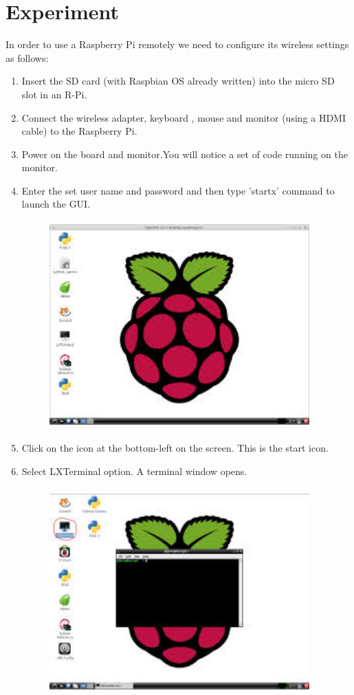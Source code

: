 \documentclass[11pt,a4paper]{article}
\begin{document}
	\newpage
	\section{Experiment}
	In order to use a Raspberry Pi remotely we need to configure its wireless settings as follows:
	\begin{enumerate}
		\item Insert the SD card (with Raspbian OS already written) into the micro SD slot in an R-Pi.
		\item Connect the wireless adapter, keyboard , mouse and monitor (using a HDMI cable) to the Raspberry Pi.
		\item Power on the board and monitor.You will notice a set of code running on the monitor.
		\item Enter the set user name and password and then type 'startx' command to launch the GUI.
		\begin{figure}[h!]
			\includegraphics[width=10cm,height=8cm]{r1.jpg}
			\centering
		\end{figure} 
		\item Click on the icon at the bottom-left on the screen. This is the start icon.
		\item Select LXTerminal option. A terminal window opens.
		\newpage
		\begin{figure}[h!]
			\includegraphics[width=10cm,height=8cm]{lxt.jpg}

\end{figure}
\end{enumerate}
\end{document}
